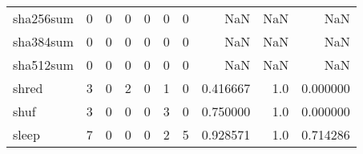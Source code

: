 \begin{tabular}{lrrrrrrrrr}
sha256sum &                                       0 &                                                  0 &                                                  0 &                                                  0 &                                                  0 &                                                  0 &                                                NaN &                                    NaN &                                  NaN \\
sha384sum &                                       0 &                                                  0 &                                                  0 &                                                  0 &                                                  0 &                                                  0 &                                                NaN &                                    NaN &                                  NaN \\
sha512sum &                                       0 &                                                  0 &                                                  0 &                                                  0 &                                                  0 &                                                  0 &                                                NaN &                                    NaN &                                  NaN \\
shred     &                                       3 &                                                  0 &                                                  2 &                                                  0 &                                                  1 &                                                  0 &                                           0.416667 &                                    1.0 &                             0.000000 \\
shuf      &                                       3 &                                                  0 &                                                  0 &                                                  0 &                                                  3 &                                                  0 &                                           0.750000 &                                    1.0 &                             0.000000 \\
sleep     &                                       7 &                                                  0 &                                                  0 &                                                  0 &                                                  2 &                                                  5 &                                           0.928571 &                                    1.0 &                             0.714286 \\

\end{tabular}
